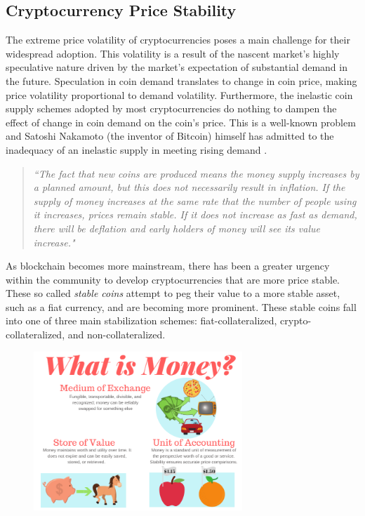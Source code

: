 \subsection{Cryptocurrency Price Stability}
The extreme price volatility of cryptocurrencies poses a main challenge for their widespread adoption. This volatility is a result of the nascent market's highly speculative nature driven by the market's expectation of substantial demand in the future. Speculation in coin demand translates to change in coin price, making price volatility proportional to demand volatility. Furthermore, the inelastic coin supply schemes adopted by most cryptocurrencies do nothing to dampen the effect of change in coin demand on the coin's price. This is a well-known problem and Satoshi Nakamoto (the inventor of Bitcoin) himself has admitted to the inadequacy of an inelastic supply in meeting rising demand \cite{Satoshi08}.
%
\begin{framed}
\begin{quote}
\textit{``The fact that new coins are produced means the money supply increases by a planned amount, but this does not necessarily result in inflation. If the supply of money increases at the same rate that the number of people using it increases, prices remain stable. If it does not increase as fast as demand, there will be deflation and early holders of money will see its value increase."}
\end{quote}
\end{framed}

As blockchain becomes more mainstream, there has been a greater urgency within the community to develop cryptocurrencies that are more price stable. These so called \textit{stable coins} attempt to peg their value to a more stable asset, such as a fiat currency, and are becoming more prominent. These stable coins fall into one of three main stabilization schemes: fiat-collateralized, crypto-collateralized, and non-collateralized. 

\begin{figure}[H] %
	\centering
	\includegraphics[keepaspectratio, width=0.7\textwidth]{images/Money.png}
	\label{fig:Money}
\end{figure}

